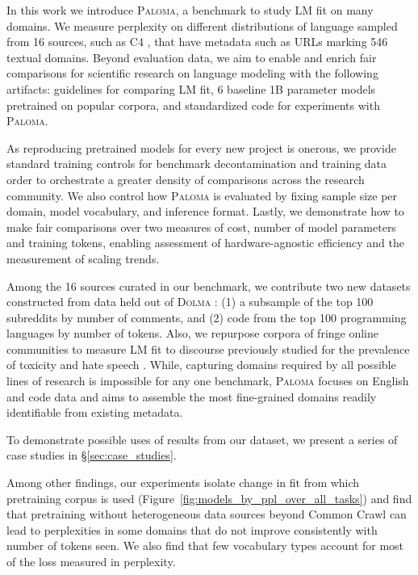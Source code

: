 In this work we introduce \textsc{Paloma}, a benchmark to study LM fit on many domains. We measure perplexity on different distributions of language sampled from 16 sources, such as \textsc{C4} \citep{Raffel2019ExploringTL}, that have metadata such as URLs marking 546 textual domains. Beyond evaluation data, we aim to enable and enrich fair comparisons for scientific research on language modeling with the following artifacts: guidelines for comparing LM fit, 6 baseline 1B parameter models pretrained on popular corpora, and standardized code for experiments with \textsc{Paloma}.

As reproducing pretrained models for every new project is onerous, we provide standard training controls for benchmark decontamination and training data order to orchestrate a greater density of comparisons across the research community. We also control how \textsc{Paloma} is evaluated by fixing sample size per domain, model vocabulary, and inference format. Lastly, we demonstrate how to make fair comparisons over two measures of cost, number of model parameters and training tokens, enabling assessment of hardware-agnostic efficiency and the measurement of scaling trends.

Among the 16 sources curated in our benchmark, we contribute two new datasets constructed from data held out of \textsc{Dolma} \citep{dolma}: (1) a subsample of the top 100 subreddits by number of comments, and (2) code from the top 100 programming languages by number of tokens. Also, we repurpose corpora of fringe online communities to measure LM fit to discourse previously studied for the prevalence of toxicity and hate speech \citep{Horta_Ribeiro_2021,ZannettouGab,Papasavva_2020}. While, capturing domains required by all possible lines of research is impossible for any one benchmark, \textsc{Paloma} focuses on English and code data and aims to assemble the most fine-grained domains readily identifiable from existing metadata.

To demonstrate possible uses of results from our dataset, we present a series of case studies in \S\ref{sec:case_studies}. 

Among other findings, our experiments isolate change in fit from which pretraining corpus is used (Figure~\ref{fig:models_by_ppl_over_all_tasks}) and find that pretraining without heterogeneous data sources beyond Common Crawl can lead to perplexities in some domains that do not improve consistently with number of tokens seen. We also find that few vocabulary types account for most of the loss measured in perplexity.


